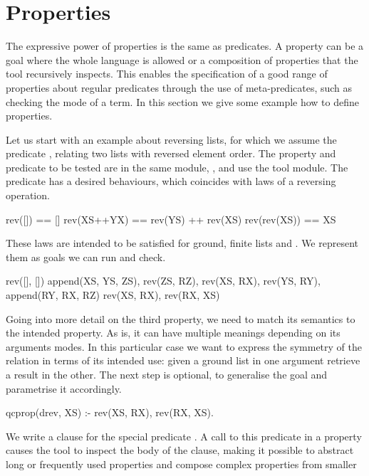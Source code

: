 
\section{Properties}
\label{sec:properties}


The expressive power of properties is the same as \Prolog{}
predicates.
%
A property can be a goal where the whole language is allowed or a
composition of properties that the \plqc{} tool recursively inspects.
%
This enables the specification of a good range of properties about
regular predicates through the use of meta-predicates, such as checking
the mode of a term.
%
In this section we give some example how to define properties.


Let us start with an example about reversing lists, for which we assume the
predicate , relating two lists with reversed element order.
%
The property and predicate to be tested are in the same module,
, and use the \plqc{} tool module.
%
The  predicate has a desired behaviours, which
coincides with laws of a reversing operation.
{
\begin{code}
      rev([])   == []
  rev(XS++YX)   == rev(YS) ++ rev(XS)
  rev(rev(XS))  == XS
\end{code}
}
These laws are intended to be satisfied for ground, finite lists
 and .
%
We represent them as \Prolog{} goals we can run and check.
%
\begin{yapcode}
 rev([], [])
 append(XS, YS, ZS), rev(ZS, RZ),
  rev(XS, RX), rev(YS, RY),
   append(RY, RX, RZ)
 rev(XS, RX), rev(RX, XS)
\end{yapcode}
%
Going into more detail on the third property, we need to match its
semantics to the intended property.
%
As is, it can have multiple meanings depending on its arguments modes.
%
In this particular case we want to express the symmetry of the
 relation in terms of its intended use: given a ground
list in one argument retrieve a result in the other.
%
The next step is optional, to generalise the goal and parametrise it
accordingly.
%
\begin{yapcode}
 qcprop({drev, XS}) :-
   rev(XS, RX), rev(RX, XS).
\end{yapcode}
%
We write a clause for the special predicate .
%
A call to this predicate in a \plqc{} property causes the tool to
inspect the body of the clause, making it possible to abstract long or
frequently used properties and compose complex properties from smaller
